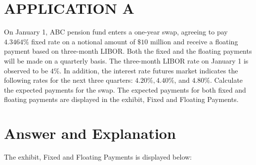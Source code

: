 \documentclass[11pt]{article}
\begin{document}
\section*{APPLICATION A}
On January 1, ABC pension fund enters a one-year swap, agreeing to pay $4.3464 \%$ fixed rate on a notional amount of $\$ 10$ million and receive a floating payment based on three-month LIBOR. Both the fixed and the floating payments will be made on a quarterly basis. The three-month LIBOR rate on January 1 is observed to be $4 \%$. In addition, the interest rate futures market indicates the following rates for the next three quarters: $4.20 \%, 4.40 \%$, and $4.80 \%$. Calculate the expected payments for the swap. The expected payments for both fixed and floating payments are displayed in the exhibit, Fixed and Floating Payments.

\section*{ Answer and Explanation}
The exhibit, Fixed and Floating Payments is displayed below:
\end{document}
